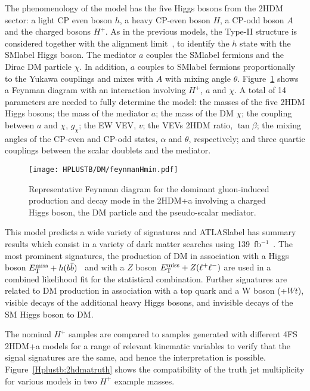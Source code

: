 The phenomenology of the model has the five Higgs bosons from the 2HDM sector: a light CP even boson $h$, a heavy CP-even boson $H$, a CP-odd boson $A$ and the charged bosons $H^+$. As in the previous models, the Type-II structure is considered together with the alignment limit~\cite{Gunion_2003}, to identify the $h$ state with the \acrshort{SMlabel} Higgs boson. The mediator $a$ couples the \acrshort{SMlabel} fermions and the Dirac DM particle $\chi$. In addition, $a$ couples to \acrshort{SMlabel} fermions proportionally to the Yukawa couplings and mixes with $A$ with mixing angle $\theta$. Figure~\ref{Hplustb:2hdmafeynman} shows a Feynman diagram with an interaction involving $H^+$, $a$ and $\chi$. A total of 14 parameters are needed to fully determine the model: the masses of the five 2HDM Higgs bosons; the mass of the mediator $a$; the mass of the DM $\chi$; the coupling between $a$ and $\chi$, $g_\chi$; the \acrshort{EW} \acrshort{VEV}, $v$; the \acrshort{VEV}s 2HDM ratio, $\tan\beta$; the mixing angles of the CP-even and CP-odd states, $\alpha$ and $\theta$, respectively; and three quartic couplings between the scalar doublets and the mediator.

\begin{figure}[htb]
    \RawFloats
    \centering
    \texttt{[image: HPLUSTB/DM/feynmanHmin.pdf]}
    \caption{Representative Feynman diagram for the dominant gluon-induced production and decay mode in the 2HDM+a involving a charged Higgs boson, the DM particle and the pseudo-scalar mediator.}
    \label{Hplustb:2hdmafeynman}
\end{figure}

This model predicts a wide variety of signatures and \acrshort{ATLASlabel} has summary results which consist in a variety of dark matter searches using 139~fb$^{-1}$~\cite{Hpluscomb}. The most prominent signatures, the production of DM in association with a Higgs boson $E_{\text{T}}^{\text{miss}}+h(b\bar{b})$~\cite{2108.13391} and with a $Z$ boson $E_{\text{T}}^{\text{miss}}+Z(\ell^+\ell^-)$ are used in a combined likelihood fit for the statistical combination. Further signatures are related to DM production in association with a top quark and a W boson (\MET+$Wt$), visible decays of the additional heavy Higgs bosons, and invisible decays of the SM Higgs boson to DM. 

The nominal $H^+$ samples are compared to samples generated with different 4FS 2HDM+a models for a range of relevant kinematic variables to verify that the signal signatures are the same, and hence the interpretation is possible. Figure~\ref{Hplustb:2hdmatruth} shows the compatibility of the truth jet multiplicity for various models in two $H^+$ example masses.

